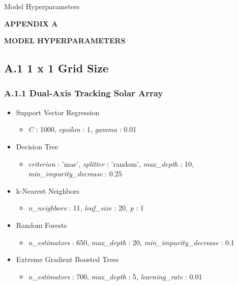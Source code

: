 \newpage


{\qquad\protect{} \hspace{0.5em} Model Hyperparameters
}

\begin{center}
    \textbf{APPENDIX A}

    \MakeUppercase{\textbf{Model Hyperparameters}}
    \vspace*{\baselineskip}
\end{center}

\subsection*{A.1 \hspace{0.5em} 1 x 1 Grid Size}
\subsubsection*{A.1.1 \hspace{0.5em} Dual-Axis Tracking Solar Array}
\begin{itemize}
    \item Support Vector Regression
    \begin{itemize}
        \item \textit{C} : 1000, \textit{epsilon} : 1,  \textit{gamma} : 0.01 
    \end{itemize}

    \item Decision Tree 
    \begin{itemize}
        \item \textit{criterion} : 'mae', \textit{splitter} : 'random', \textit{max\_depth} : 10, \textit{min\_impurity\_decrease} : 0.25
    \end{itemize}

    \item k-Nearest Neighbors 
    \begin{itemize}
        \item \textit{n\_neighbors} : 11, \textit{leaf\_size} : 20, \textit{p} : 1
    \end{itemize}

    \item Random Forests 
    \begin{itemize}
        \item \textit{n\_estimators} : 650, \textit{max\_depth} : 20, \textit{min\_impurity\_decrease} : 0.1
    \end{itemize}

    \item Extreme Gradient Boosted Trees
    \begin{itemize}
        \item \textit{n\_estimators} : 700, \textit{max\_depth} : 5, \textit{learning\_rate} : 0.01 
    \end{itemize}

\end{itemize}

